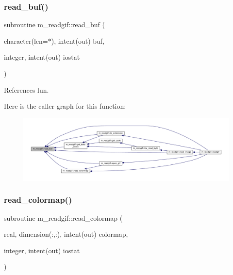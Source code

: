 \subsubsection{\texorpdfstring{read\+\_\+buf()}{read\_buf()}}
{\footnotesize\ttfamily subroutine m\+\_\+readgif\+::read\+\_\+buf (\begin{DoxyParamCaption}\item[{character(len=$\ast$), intent(out)}]{buf,  }\item[{integer, intent(out)}]{iostat }\end{DoxyParamCaption})\hspace{0.3cm}{\ttfamily [private]}}



References lun.

Here is the caller graph for this function\+:\nopagebreak
\begin{figure}[H]
\begin{center}
\leavevmode
\includegraphics[width=350pt]{namespacem__readgif_a272a4dbcc1419d3d103db4c50b757805_icgraph}
\end{center}
\end{figure}
\mbox{\label{namespacem__readgif_aabaf13dcb1e665b2524049e5661ca4b6}} 
\subsubsection{\texorpdfstring{read\+\_\+colormap()}{read\_colormap()}}
{\footnotesize\ttfamily subroutine m\+\_\+readgif\+::read\+\_\+colormap (\begin{DoxyParamCaption}\item[{real, dimension(\+:,\+:), intent(out)}]{colormap,  }\item[{integer, intent(out)}]{iostat }\end{DoxyParamCaption})\hspace{0.3cm}{\ttfamily [private]}}



